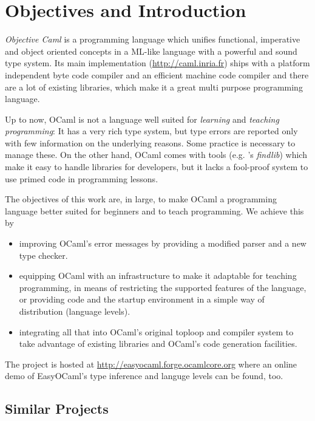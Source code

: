 
\section{Objectives and Introduction}
\label{sec:intro}

\label{hd001}
\emph{Objective Caml} \citep{leroy2008} is a programming language which unifies 
functional, imperative and object oriented concepts in a ML-like 
language with a powerful and sound type system.  Its main implementation 
(\url{http://caml.inria.fr}) ships with a platform independent byte code
compiler and an efficient machine code compiler and there are a lot of existing
libraries, which make it a great multi purpose programming language.

Up to now, OCaml is not a language well suited for \emph{learning} and
\emph{teaching programming}:
It has a very rich type system, but type errors are reported only with few
information on the underlying reasons.
Some practice is necessary to manage these.
On the other hand, OCaml comes with tools (e.g.  \citeauthor{stolpmann}'s
\emph{findlib}) which make it easy to handle libraries for developers, but it
lacks a fool-proof system to use primed code in programming lessons.

The objectives of this work are, in large, to make OCaml a
programming language better suited for beginners and to teach programming. We
achieve this by

\begin{itemize}
    \item improving OCaml's error messages by providing a modified 
        parser and a new type checker.
    \item equipping OCaml with an infrastructure to make it 
        adaptable for teaching programming, in means of restricting the 
        supported features of the language, or providing code and the 
        startup environment in a simple way of distribution (language 
        levels).
    \item integrating all that into OCaml's original toploop and 
        compiler system to take advantage of existing libraries and 
        OCaml's code generation facilities.
\end{itemize}
The project is hosted at
\url{http://easyocaml.forge.ocamlcore.org}  where an online demo of EasyOCaml's
type inference and languge levels can be found, too.

\subsection{Similar Projects}

